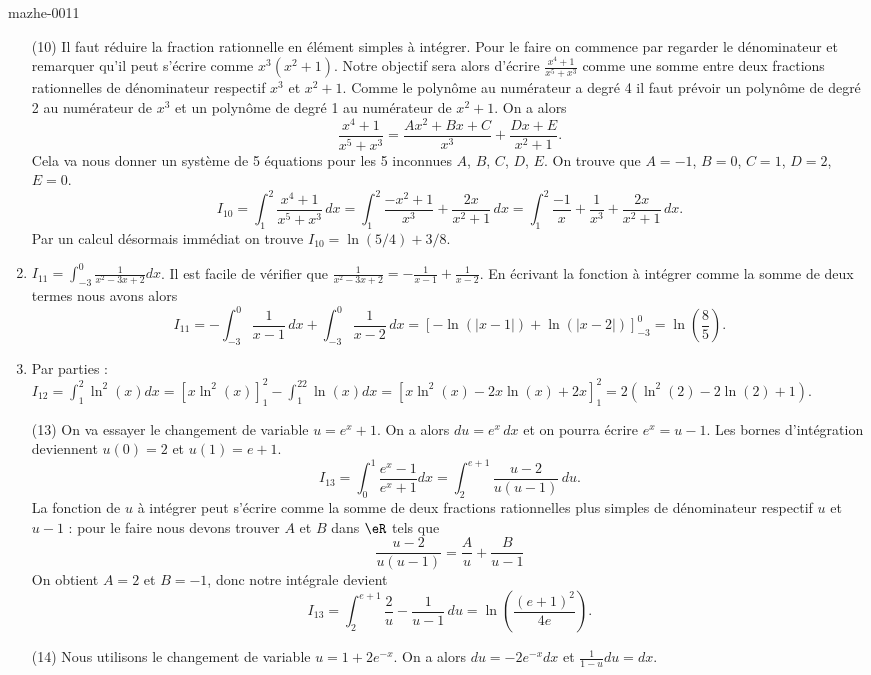 \begin{corrige}{mazhe-0011}
\begin{enumerate}
    \item[(10)]  Il faut réduire la fraction rationnelle en élément simples à intégrer. Pour le faire on commence par regarder le dénominateur et remarquer qu'il peut s'écrire comme $x^3 (x^2 + 1)$. Notre objectif sera alors d'écrire $\frac{x^4+1}{x^5+x^3}$ comme une somme entre deux fractions rationnelles de dénominateur respectif $x^3$ et $x^2+1$. Comme le polyn\^ome au numérateur a degré 4 il faut prévoir un polyn\^ome de degré 2 au numérateur de $x^3$ et un  polyn\^ome de degré 1 au numérateur de $x^2+1$. On a alors 
      \[
      \frac{x^4+1}{x^5+x^3} = \frac{Ax^2+Bx + C}{x^3} +\frac{Dx+E}{x^2+1}. 
      \]
      Cela va nous donner un système de 5 équations pour les 5 inconnues $A$, $B$, $C$, $D$, $E$. On trouve que $A = -1$, $B = 0$, $C =1$, $D = 2$, $E = 0$. 
      \[
      I_{10}=\int_{1}^{2}\frac{x^4+1}{x^5+x^3}\, dx  = \int_{1}^{2}\frac{-x^2+1}{x^3} +\frac{2x}{x^2+1}\, dx  =\int_{1}^{2}\frac{-1}{x} +\frac{1}{x^3} +\frac{2x}{x^2+1}\, dx .
      \]
      Par un calcul désormais immédiat on trouve $I_{10}= \ln(5/4) + 3/8$.
    \item $\displaystyle I_{11}=\int_{-3}^0\frac{1}{ x^2-3x+2 }dx$. Il est facile de vérifier que $\frac{1}{ x^2-3x+2 } =- \frac{ 1}{ x-1 }+\frac{ 1}{ x-2 }$. En écrivant la fonction à intégrer comme la somme de deux termes nous avons alors 
\[
I_{11}=-\int_{-3}^0\frac{ 1}{ x-1 }\,dx+\int_{-3}^0\frac{ 1}{ x-2 }\,dx = \left[-\ln(|x-1|)+\ln(|x-2|)\right]_{-3}^0 = \ln\left(\frac{8}{5}\right).
\]
    \item Par parties : $\displaystyle I_{12}=\int_1^2\ln^2(x)dx =\left[x\ln^2(x)\right]_{1}^2 - \int_1^22\ln(x)dx = \left[x\ln^2(x)-2x\ln(x) + 2x\right]_{1}^2 = 2\left(\ln^2(2)-2\ln(2) + 1\right) $.
    \item[(13)]  On va essayer le changement de variable $u= e^x+1 $. On a alors $du = e^x \,dx$ et on pourra écrire $e^x = u-1$. Les bornes d'intégration deviennent $u(0) = 2$ et $u(1) = e + 1$.
      \[
      I_{13}=\int_0^1\frac{ e^x-1 }{ e^x+1 }dx = \int_2^{e+1}\frac{u-2}{u(u-1)} \, du.
      \]
      La fonction de $u$ à intégrer peut s'écrire comme la somme de deux fractions rationnelles plus simples de dénominateur respectif $u$ et $u-1$ : pour le faire nous devons trouver $A$ et $B$ dans $\eR$ tels que 
      \[
      \frac{u-2}{u(u-1)} = \frac{A}{u} +\frac{B}{u-1} 
      \]
      On obtient $A=2$ et $B= -1$, donc notre intégrale devient 
      \[
      I_{13}=\int_2^{e+1} \frac{2}{u} -\frac{1}{u-1}\, du = \ln\left(\frac{(e+1)^2}{4e}\right).
      \]
    \item[(14)] Nous utilisons le changement de variable $u= 1+2e^{-x}$. On a alors $du = -2e^{-x} dx$  et $\frac{1}{1-u}du = dx$.  

\end{enumerate}
\end{corrige}
